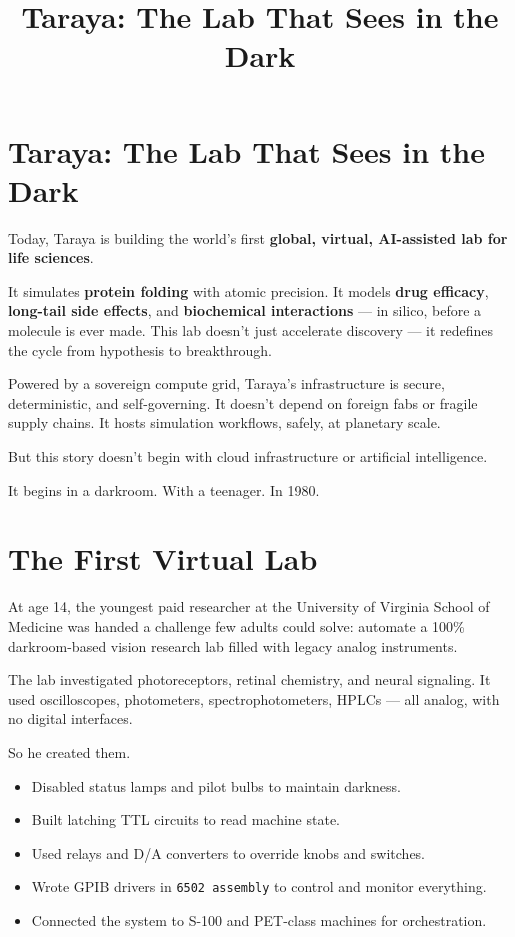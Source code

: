 \documentclass[12pt]{article}
\title{\vspace{-2cm}Taraya: The Lab That Sees in the Dark\vspace{1cm}}
\author{}
\date{}
\begin{document}
    \maketitle
    \begin{spacing}{1.25}

        \section*{Taraya: The Lab That Sees in the Dark}

        Today, Taraya is building the world’s first \textbf{global, virtual, AI-assisted lab for life sciences}.

        It simulates \textbf{protein folding} with atomic precision. It models \textbf{drug efficacy}, \textbf{long-tail side effects}, and \textbf{biochemical interactions} — in silico, before a molecule is ever made. This lab doesn’t just accelerate discovery — it redefines the cycle from hypothesis to breakthrough.

        Powered by a sovereign compute grid, Taraya’s infrastructure is secure, deterministic, and self-governing. It doesn’t depend on foreign fabs or fragile supply chains. It hosts simulation workflows, safely, at planetary scale.

        But this story doesn’t begin with cloud infrastructure or artificial intelligence.

        It begins in a darkroom. With a teenager. In 1980.

        \section*{The First Virtual Lab}

        At age 14, the youngest paid researcher at the University of Virginia School of Medicine was handed a challenge few adults could solve: automate a 100\% darkroom-based vision research lab filled with legacy analog instruments.

        The lab investigated photoreceptors, retinal chemistry, and neural signaling. It used oscilloscopes, photometers, spectrophotometers, HPLCs — all analog, with no digital interfaces.

        So he created them.

        \begin{itemize}
            \item Disabled status lamps and pilot bulbs to maintain darkness.
            \item Built latching TTL circuits to read machine state.
            \item Used relays and D/A converters to override knobs and switches.
            \item Wrote GPIB drivers in \texttt{6502 assembly} to control and monitor everything.
            \item Connected the system to S-100 and PET-class machines for orchestration.
        \end{itemize}


\end{spacing}
\end{document}
